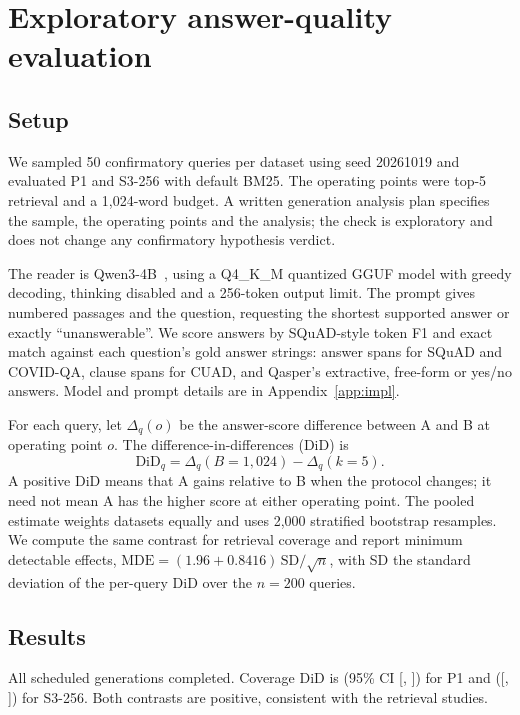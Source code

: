 \documentclass[11pt]{article}
\begin{document}
\section{Exploratory answer-quality evaluation}\label{sec:tier2}
\subsection{Setup}
We sampled 50 confirmatory queries per dataset using seed 20261019 and evaluated P1 and S3-256 with default BM25. The operating points were top-5 retrieval and a 1,024-word budget. A written generation analysis plan specifies the sample, the operating points and the analysis; the check is exploratory and does not change any confirmatory hypothesis verdict.

The reader is Qwen3-4B~\cite{qwen2025qwen3}, using a Q4\_K\_M quantized GGUF model with greedy decoding, thinking disabled and a 256-token output limit. The prompt gives numbered passages and the question, requesting the shortest supported answer or exactly ``unanswerable''. We score answers by SQuAD-style token F1 and exact match against each question's gold answer strings: answer spans for SQuAD and COVID-QA, clause spans for CUAD, and Qasper's extractive, free-form or yes/no answers. Model and prompt details are in Appendix~\ref{app:impl}.

For each query, let $\Delta_q(o)$ be the answer-score difference between A and B at operating point $o$. The difference-in-differences (DiD) is
\begin{equation}
\mathrm{DiD}_q=\Delta_q(B=1{,}024)-\Delta_q(k=5).
\label{eq:did}
\end{equation}
A positive DiD means that A gains relative to B when the protocol changes; it need not mean A has the higher score at either operating point. The pooled estimate weights datasets equally and uses 2,000 stratified bootstrap resamples. We compute the same contrast for retrieval coverage and report minimum detectable effects, $\mathrm{MDE}=(1.96+0.8416)\,\mathrm{SD}/\sqrt{n}$, with SD the standard deviation of the per-query DiD over the $n=200$ queries.

\subsection{Results}
All scheduled generations completed. Coverage DiD is \EtwoPoneCov{} (95\% CI [\EtwoPoneCovLo, \EtwoPoneCovHi]) for P1 and \EtwoSthreeCov{} ([\EtwoSthreeCovLo, \EtwoSthreeCovHi]) for S3-256. Both contrasts are positive, consistent with the retrieval studies.
\end{document}

